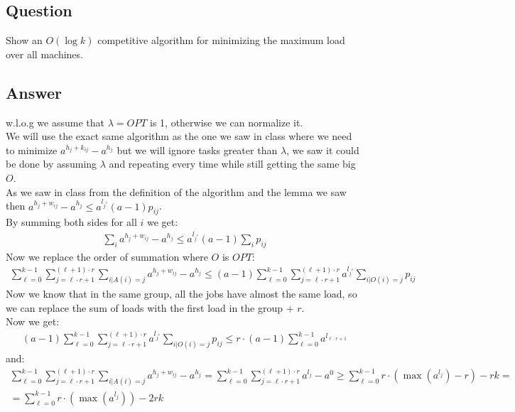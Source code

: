 \subsection{Question}
Show an $O(\log k)$ competitive algorithm for minimizing the maximum load over all machines.\\

\subsection{Answer}
w.l.o.g we assume that $\lambda = OPT$ is 1, otherwise we can normalize it.\\
We will use the exact same algorithm as the one we saw in class where we need to minimize $a^{h_{j}+k_{ij}} - a^{h_{j}}$ but we will ignore tasks greater than $\lambda$, we saw it could be done by assuming $\lambda$ and repeating every time while still getting the same big $O$.\\
As we saw in class from the definition of the algorithm and the lemma we saw then $a^{h_{j}+w_{ij}} - a^{h_{j}} \leq a^{l_{j^{*}}}(a-1)p_{ij}$.\\
By summing both sides for all $i$ we get:
\begin{gather*}
    \sum_{i} a^{h_{j}+w_{ij}} - a^{h_{j}} \leq a^{l_{j^{*}}}(a-1)\sum_{i} p_{ij}
\end{gather*}
Now we replace the order of summation where $O$ is $OPT$:
\begin{gather*}
    \sum_{\ell=0}^{k-1} \sum_{j=\ell\cdot r + 1}^{(\ell+1)\cdot r} \sum_{i|A(i)=j} a^{h_{j}+w_{ij}} - a^{h_{j}} \leq 
    (a-1) \sum_{\ell=0}^{k-1} \sum_{j=\ell\cdot r + 1}^{(\ell+1)\cdot r} a^{l_{j^{*}}} \sum_{i|O(i)=j} p_{ij}
\end{gather*}
Now we know that in the same group, all the jobs have almost the same load, so we can replace the sum of loads with the first load in the group + $r$.\\
Now we get:\\
\begin{gather*}
    (a-1) \sum_{\ell=0}^{k-1} \sum_{j=\ell\cdot r + 1}^{(\ell+1)\cdot r} a^{l_{j^{*}}} \sum_{i|O(i)=j} p_{ij} \leq 
    r\cdot(a-1) \sum_{\ell=0}^{k-1} a^{l_{\ell\cdot r + 1}}
\end{gather*}
and:
\begin{gather*}
    \sum_{\ell=0}^{k-1} \sum_{j=\ell\cdot r + 1}^{(\ell+1)\cdot r} \sum_{i|A(i)=j} a^{h_{j}+w_{ij}} - a^{h_{j}} =
    \sum_{\ell=0}^{k-1} \sum_{j=\ell\cdot r + 1}^{(\ell+1)\cdot r} a^{l_j} - a^{0} \geq 
    \sum_{\ell=0}^{k-1} r\cdot(\max(a^{l_{j}}) - r) - rk = \\ =
    \sum_{\ell=0}^{k-1} r\cdot(\max(a^{l_{j}})) - 2rk
\end{gather*}
